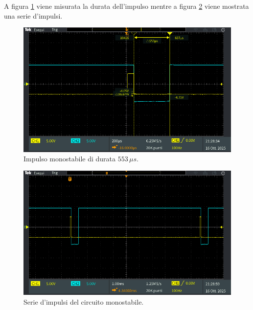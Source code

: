 \documentclass[a4paper,12pt]{article}
\begin{document}

\noindent A figura \ref{fig:monostabile_impulso_durata} viene misurata la durata dell'impulso mentre a figura \ref{fig:monostabile_impulsi} viene mostrata una serie d'impulsi.
\begin{figure}[h]
	\centering
	\includegraphics[width=0.7\linewidth]{immagini/monostabile/monostabile_durata.PNG}
	\caption{Impulso monostabile di durata $ 553\,\mu s$.}
	\label{fig:monostabile_impulso_durata}
\end{figure}

\begin{figure}[h]
	\centering
	\includegraphics[width=0.7\linewidth]{immagini/monostabile/monostabile_impulsi.PNG}
	\caption{Serie d'impulsi del circuito monostabile.}
	\label{fig:monostabile_impulsi}
\end{figure}
\end{document}
